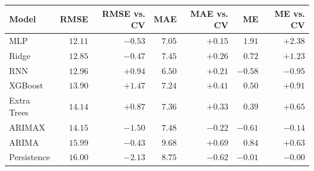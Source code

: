 \begin{tabular}{@{}lrrrrrr@{}}
\toprule
\textbf{Model} & \textbf{RMSE} & \textbf{RMSE vs. CV} & \textbf{MAE} & \textbf{MAE vs. CV} & \textbf{ME} & \textbf{ME vs. CV} \\
\midrule
MLP & $12.11$ & $-0.53$ & $7.05$ & $+0.15$ & $1.91$ & $+2.38$ \\
\addlinespace
Ridge & $12.85$ & $-0.47$ & $7.45$ & $+0.26$ & $0.72$ & $+1.23$ \\
\addlinespace
RNN & $12.96$ & $+0.94$ & $6.50$ & $+0.21$ & $-0.58$ & $-0.95$ \\
\addlinespace
XGBoost & $13.90$ & $+1.47$ & $7.24$ & $+0.41$ & $0.50$ & $+0.91$ \\
\addlinespace
Extra Trees & $14.14$ & $+0.87$ & $7.36$ & $+0.33$ & $0.39$ & $+0.65$ \\
\addlinespace
ARIMAX & $14.15$ & $-1.50$ & $7.48$ & $-0.22$ & $-0.61$ & $-0.14$ \\
\addlinespace
ARIMA & $15.99$ & $-0.43$ & $9.68$ & $+0.69$ & $0.84$ & $+0.63$ \\
\addlinespace
Persistence & $16.00$ & $-2.13$ & $8.75$ & $-0.62$ & $-0.01$ & $-0.00$ \\
\bottomrule
\end{tabular}
